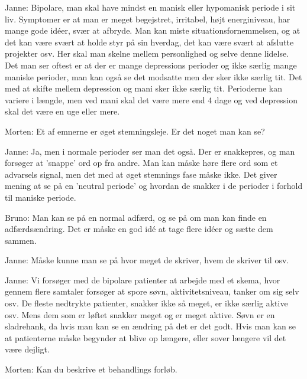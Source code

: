 Janne: Bipolare, man skal have mindst en manisk eller hypomanisk periode i sit liv. Symptomer er at man er meget begejstret, irritabel, højt energiniveau, har mange gode idéer, svær at afbryde. Man kan miste situationsfornemmelsen, og at det kan være svært at holde styr på sin hverdag, det kan være svært at afslutte projekter osv. Her skal man skelne mellem personlighed og selve denne lidelse. Det man ser oftest er at der er mange depressions perioder og ikke særlig mange maniske perioder, man kan også se det modsatte men der sker ikke særlig tit. Det med at skifte mellem depression og mani sker ikke særlig tit. Perioderne kan variere i længde, men ved mani skal det være mere end 4 dage og ved depression skal det være en uge eller mere. 

Morten: Et af emnerne er øget stemningsleje. Er det noget man kan se?

Janne: Ja, men i normale perioder ser man det også. Der er snakkepres, og man forsøger at 'snappe' ord op fra andre. Man kan måske høre flere ord som et advarsels signal, men det med at øget stemnings fase måske ikke. Det giver mening at se på en 'neutral periode' og hvordan de snakker i de perioder i forhold til maniske periode.

Bruno: Man kan se på en normal adfærd, og se på om man kan finde en adfærdsændring. Det er måske en god idé at tage flere idéer og sætte dem sammen.

Janne: Måske kunne man se på hvor meget de skriver, hvem de skriver til osv. 

Janne: Vi forsøger med de bipolare patienter at arbejde med et skema, hvor gennem flere samtaler forsøger at spore søvn, aktivitetsniveau, tanker om sig selv osv. De fleste nedtrykte patienter, snakker ikke så meget, er ikke særlig aktive osv. Mens dem som er løftet snakker meget og er meget aktive. Søvn er en sladrehank, da hvis man kan se en ændring på det er det godt. Hvis man kan se at patienterne måske begynder at blive op længere, eller sover længere vil det være dejligt.

Morten: Kan du beskrive et behandlings forløb.

